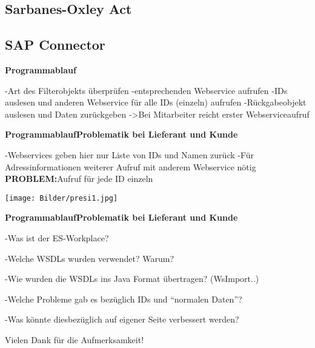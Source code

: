 \documentclass[xcolor=dvipsnames, compress, 10pt]{beamer}
\begin{document}
\subsection*{Sarbanes-Oxley Act}

\subsection{SAP Connector}

\begin{frame}
\begin{center}
\textbf{Programmablauf}

-Art des Filterobjekts überprüfen
-entsprechenden Webservice aufrufen
-IDs auslesen und anderen Webservice für alle IDs (einzeln) aufrufen
-Rückgabeobjekt auslesen und Daten zurückgeben
->Bei Mitarbeiter reicht erster Webserviceaufruf


\end{center}
\end{frame}

\begin{frame}
\begin{center}
\textbf{ProgrammablaufProblematik bei Lieferant und Kunde}

-Webservices geben hier nur Liste von IDs und Namen zurück
-Für Adressinformationen weiterer Aufruf mit anderem Webservice nötig
\textbf{PROBLEM:}Aufruf für jede ID einzeln

\end{center}
\end{frame}

\begin{frame}
\begin{center}

\texttt{[image: Bilder/presi1.jpg]} 

\end{center}
\end{frame}

\textbf{ProgrammablaufProblematik bei Lieferant und Kunde}

\begin{frame}
\begin{center}



\end{center}
\end{frame}

-Was ist der ES-Workplace?

-Welche WSDLs wurden verwendet? Warum?

-Wie wurden die WSDLs ins Java Format übertragen? (WsImport..)

-Welche Probleme gab es bezüglich IDs und ``normalen Daten''?

-Was könnte diesbezüglich auf eigener Seite verbessert werden?



\begin{frame}
\begin{center}
Vielen Dank f\"ur die Aufmerksamkeit!
\end{center}
\end{frame}
\end{document}
